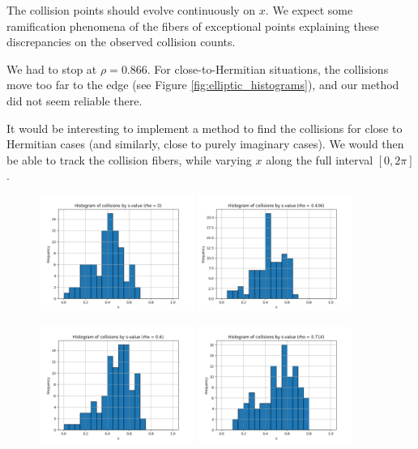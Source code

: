 \documentclass{article}
\begin{document}
	The collision points should evolve continuously on $x$. 
	We expect some ramification phenomena of the fibers of exceptional points 
	explaining these discrepancies on the observed collision counts.	
	
	We had to stop at $\rho = 0.866$. 
	For close-to-Hermitian situations, the collisions move too far to the edge
	(see Figure \ref{fig:elliptic_histograms}), 
	and our method did not seem reliable there.

	It would be interesting to implement a method to find the collisions 
	for close to Hermitian cases (and similarly, close to purely imaginary cases). 
	We would then be able to track the collision fibers, 
	while varying $x$ along the full interval $[0, 2\pi]$.

	\begin{figure}[htbp]
		\centering
		\includegraphics[width=0.45\textwidth]{figures/Histogram_rho_0.pdf}
		\includegraphics[width=0.45\textwidth]{figures/Histogram_rho_1.pdf}

		\includegraphics[width=0.45\textwidth]{figures/Histogram_rho_2.pdf}
		\includegraphics[width=0.45\textwidth]{figures/Histogram_rho_3.pdf}


\end{figure}
\end{document}
